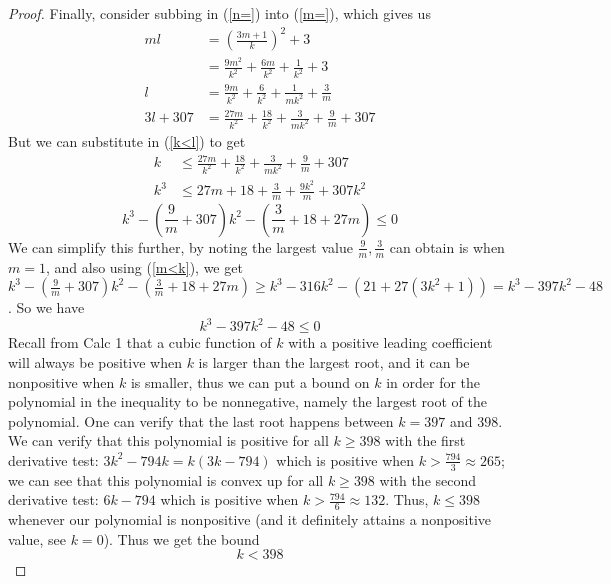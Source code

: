 \documentclass{article}
\begin{document}
\begin{proof}
	Finally, consider subbing in (\ref{n=}) into (\ref{m=}),
	which gives us
	\begin{align*}
		ml &= \left(\frac{3m+1}{k}\right)^2 + 3\\
		   &= \frac{9m^2}{k^2} + \frac{6m}{k^2} + \frac{1}{k^2} + 3\\
		l &= \frac{9m}{k^2} + \frac{6}{k^2} + \frac{1}{mk^2} + \frac{3}{m}\\
		3l + 307 &= \frac{27m}{k^2} + \frac{18}{k^2} + \frac{3}{mk^2} + \frac{9}{m} + 307
	\end{align*}
	But we can substitute in (\ref{k<l}) to get
	\begin{align*}
		k &\leq \frac{27m}{k^2} + \frac{18}{k^2} + \frac{3}{mk^2} + \frac{9}{m} + 307\\
		k^3 &\leq 27m + 18 + \frac{3}{m} + \frac{9k^2}{m} + 307k^2
	\end{align*}
	\begin{equation*}
		k^3 - \left(\frac{9}{m} + 307\right)k^2 - \left(\frac{3}{m} + 18 + 27m\right) \leq 0
	\end{equation*}
	We can simplify this further, by noting the largest value $\frac{9}{m}, \frac{3}{m}$
	can obtain is when $m = 1$,
	and also using (\ref{m<k}), we get
	$k^3 - \left(\frac{9}{m} + 307\right)k^2 - \left(\frac{3}{m} + 18 + 27m\right)
	\geq k^3 - 316k^2 - \left(21 + 27(3k^2 + 1)\right)
	= k^3 - 397k^2 - 48$.
	So we have
	\begin{equation}
		k^3 - 397k^2 - 48 \leq 0
	\end{equation}
	Recall from Calc 1 that a cubic function of $k$ with a positive leading coefficient
	will always be positive when $k$ is larger than the largest root,
	and it can be nonpositive when $k$ is smaller,
	thus we can put a bound on $k$ in order for
	the polynomial in the inequality to be nonnegative,
	namely the largest root of the polynomial.
	One can verify that the last root happens between $k = 397$ and $398$.
	We can verify that this polynomial is positive for all $k \geq 398$
	with the first derivative test:
	$3k^2 - 794k = k(3k - 794)$ which is positive when $k > \frac{794}{3} \approx 265$;
	we can see that this polynomial is convex up for all $k \geq 398$
	with the second derivative test:
	$6k - 794$ which is positive when $k > \frac{794}{6} \approx 132$.
	Thus, $k \leq 398$ whenever our polynomial is nonpositive
	(and it definitely attains a nonpositive value, see $k = 0$).
	Thus we get the bound
	\begin{equation}\label{k<}
		k < 398
	\end{equation}


\end{proof}
\end{document}
